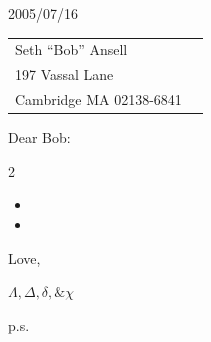 \documentclass[10pt]{article}%
\def\docdate{2005/07/16}%
\begin{document}
\thispagestyle{first}

\docdate
\medskip

\begin{tabular*}{\columnwidth}{@{\extracolsep{\fill}}lr}%
  Seth ``Bob'' Ansell &\\
  197 Vassal Lane \\
  Cambridge MA 02138-6841
\end{tabular*}
\medskip

Dear Bob:

\begin{multicols}{2}

\lipsum[2-5]

\begin{itemize}
\item \lipsum[6]
\item \lipsum[7]
\end{itemize}

\lipsum[8-9]

\end{multicols}



Love,

{\large $\Lambda, \Delta, \delta, \& \chi$}

\vspace{3ex}

\begin{minipage}[c]{0.1\linewidth}
  p.s.
\end{minipage}%
\begin{minipage}[c]{0.9\linewidth}
  \vspace{0pt} %
  \lipsum[10]%
\end{minipage}
\end{document}
